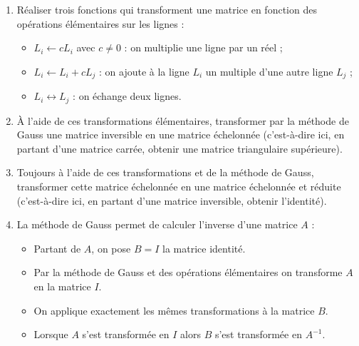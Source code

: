 \begin{frame}

\footnotesize

\begin{tp}
\begin{enumerate}
  \item Réaliser trois fonctions qui transforment une matrice en fonction des 
  opérations élémentaires sur les lignes :

\vspace*{-2ex}  

  \begin{itemize}
    \item \footnotesize$L_i \leftarrow c L_i$ avec $c \neq 0$ :
  on multiplie une ligne par un réel ;

    \item \footnotesize$L_i \leftarrow L_i+ c L_j$ :
  on ajoute à la ligne $L_i$ un multiple d'une autre ligne $L_j$ ;

    \item \footnotesize$L_i \leftrightarrow L_j$ : on échange deux lignes.
  \end{itemize}

 \vspace*{-2ex}
  
  \item À l'aide de ces transformations élémentaires, transformer par la méthode de Gauss
  une matrice inversible en une matrice échelonnée (c'est-à-dire ici, en partant d'une matrice carrée,
  obtenir une matrice triangulaire supérieure).
  
  \item Toujours à l'aide de ces transformations et de la méthode de Gauss, transformer 
  cette matrice échelonnée en une matrice échelonnée et réduite
  (c'est-à-dire ici, en partant d'une matrice inversible, obtenir l'identité).
  
  \item La méthode de Gauss permet de calculer l'inverse d'une matrice $A$ :

 \vspace*{-2ex}  
  
  \begin{itemize}
    \item \footnotesize Partant de $A$, on pose $B = I$ la matrice identité.
    \item \footnotesize Par la méthode de Gauss et des opérations élémentaires on transforme $A$ en 
    la matrice $I$. 
    \item \footnotesize On applique exactement les mêmes transformations à la matrice $B$.
    \item \footnotesize Lorsque $A$ s'est transformée en $I$ alors $B$ s'est transformée en $A^{-1}$.
  \end{itemize}
  

\end{enumerate}
\end{tp}
\end{frame}
